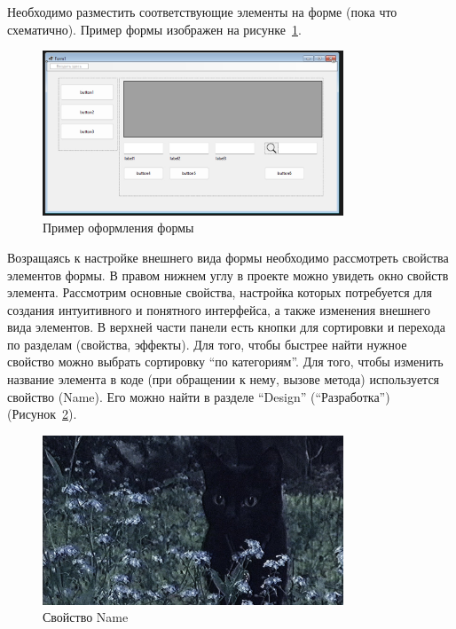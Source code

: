 \documentclass[12pt]{article}
\renewcommand{\texttt}[1]{{\small\ttfamily #1}}
\numberwithin{listing}{section}
\numberwithin{figure}{section}
\begin{document}
Необходимо разместить соответствующие элементы на форме (пока что схематично). Пример формы изображен на рисунке~\ref{fig:Пример оформления формы}.

\begin{figure}[H]
	\centering
	\includegraphics[width=0.8\textwidth]{fig/image.jpg}
	\caption{Пример оформления формы}
	\label{fig:Пример оформления формы}
\end{figure}

Возращаясь к настройке внешнего вида формы необходимо рассмотреть свойства элементов формы. В правом нижнем углу в проекте можно увидеть окно свойств элемента. Рассмотрим основные свойства, настройка которых потребуется для создания интуитивного и понятного интерфейса, а также изменения внешнего вида элементов.
В верхней части панели есть кнопки для сортировки и перехода по разделам (свойства, эффекты). Для того, чтобы быстрее найти нужное свойство можно выбрать сортировку “по категориям”.
Для того, чтобы изменить название элемента в коде (при обращении к нему, вызове метода) используется свойство (\texttt{Name}). Его можно найти в разделе “Design” (“Разработка”) (Рисунок~\ref{fig:Свойство Name}).

\begin{figure}[H]
	\centering
	\includegraphics[width=0.8\textwidth]{fig/none.png}
	\caption{Свойство \texttt{Name}\protect\footnotemark}
	\label{fig:Свойство Name}
\end{figure}
\end{document}
